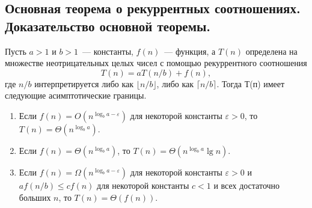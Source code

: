\documentclass[a4paper,12pt]{article}
\begin{document}
\subsection{Основная теорема о рекуррентных соотношениях. Доказательство основной теоремы.}
\begin{theorem}
	
	Пусть $a > 1$ и $b > 1$~--- константы, $f(n)$~--- функция, а $T(n)$ определена на множестве неотрицательных целых чисел с помощью рекуррентного соотношения \[T(n) = aT(n/b) + f(n),\] где $n/b$ интерпретируется либо как $\lfloor n/b \rfloor$, либо как $\lceil n/b\rceil$. Тогда Т(п) имеет следующие асимптотические границы.
	\begin{enumerate}
		\item Если $f(n) = O(n^{\log_b a - \varepsilon})$ для некоторой константы $\varepsilon > 0$, то $T(n) = \Theta(n^{\log_b a})$.
		\item Если $f(n) = \Theta(n^{\log_b a})$, то $T(n) = \Theta(n^{\log_b a}\lg n)$.
		\item Если $f(n) = \Omega(n^{\log_b a - \varepsilon})$ для некоторой константы $\varepsilon > 0$ и $af(n/b) \leqslant cf(n)$ для некоторой константы $c < 1$ и всех достаточно больших $n$, то $T(n) = \Theta(f(n))$.
	\end{enumerate}
\end{theorem}
\end{document}
